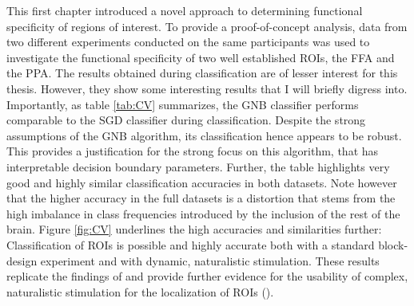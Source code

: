 \documentclass[a4paper, 12pt]{scrreprt}
\begin{document}
This first chapter introduced a novel approach to determining functional specificity of regions of interest. To provide a proof-of-concept analysis, data from two different experiments conducted on the same participants was used to investigate the functional specificity of two well established ROIs, the FFA and the PPA. \newline
The results obtained during classification are of lesser interest for this thesis. However, they show some interesting results that I will briefly digress into. Importantly, as table \ref{tab:CV} summarizes, the GNB classifier performs comparable to the SGD classifier during classification. Despite the strong assumptions of the GNB algorithm, its classification hence appears to be robust. This provides a justification for the strong focus on this algorithm, that has interpretable decision boundary parameters. Further, the table highlights very good and highly similar classification accuracies in both datasets. Note however that the higher accuracy in the full datasets is a distortion that stems from the high imbalance in class frequencies introduced by the inclusion of the rest of the brain. \newline Figure \ref{fig:CV} underlines the high accuracies and similarities further: Classification of ROIs is possible and highly accurate both with a standard block-design experiment and with dynamic, naturalistic stimulation. These results replicate the findings of \textcite{nastase2016} and provide further evidence for the usability of complex, naturalistic stimulation for the localization of ROIs (\cite{malinen2007towards}).\\
\end{document}
